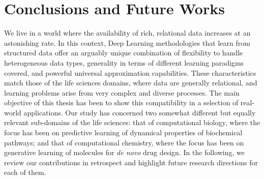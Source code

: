 \chapter{Conclusions and Future Works} %
\label{ch:conclusions}

We live in a world where the availability of rich, relational data increases at an astonishing rate. In this context, Deep Learning methodologies that learn from structured data offer an arguably unique combination of flexibility to handle heterogeneous data types, generality in terms of different learning paradigms covered, and powerful universal approximation capabilities. These characteristics match those of the life sciences domains, where data are generally relational, and learning problems arise from very complex and diverse processes. The main objective of this thesis has been to show this compatibility in a selection of real-world applications. Our study has concerned two somewhat different but equally relevant sub-domains of the life sciences: that of computational biology, where the focus has been on predictive learning of dynamical properties of biochemical pathways; and that of computational chemistry, where the focus has been on generative learning of molecules for \emph{de novo} drug design. In the following, we review our contributions in retrospect and highlight future research directions for each of them.
\vspace{1em}

